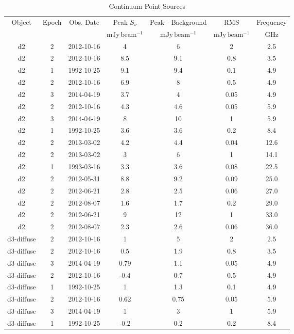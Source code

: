 \begin{table*}[htp]
\caption{Continuum Point Sources}
\begin{tabular}{ccccccc}
\label{tab:contsrcs_full}
Object & Epoch & Obs. Date & Peak $S_{\nu}$ & Peak - Background & RMS & Frequency \\
 &  &  & $\mathrm{mJy\,beam^{-1}}$ & $\mathrm{mJy\,beam^{-1}}$ & $\mathrm{mJy\,beam^{-1}}$ & $\mathrm{GHz}$ \\
\hline
d2 & 2 & 2012-10-16 & 4 & 6 & 2 & 2.5 \\
d2 & 2 & 2012-10-16 & 8.5 & 9.1 & 0.8 & 3.5 \\
d2 & 1 & 1992-10-25 & 9.1 & 9.4 & 0.1 & 4.9 \\
d2 & 2 & 2012-10-16 & 6.9 & 8 & 0.5 & 4.9 \\
d2 & 3 & 2014-04-19 & 3.7 & 4 & 0.05 & 4.9 \\
d2 & 2 & 2012-10-16 & 4.3 & 4.6 & 0.05 & 5.9 \\
d2 & 3 & 2014-04-19 & 8 & 10 & 1 & 5.9 \\
d2 & 1 & 1992-10-25 & 3.6 & 3.6 & 0.2 & 8.4 \\
d2 & 2 & 2013-03-02 & 4.2 & 4.4 & 0.04 & 12.6 \\
d2 & 2 & 2013-03-02 & 3 & 6 & 1 & 14.1 \\
d2 & 1 & 1993-03-16 & 3.3 & 3.6 & 0.08 & 22.5 \\
d2 & 2 & 2012-05-31 & 8.8 & 9.2 & 0.09 & 25.0 \\
d2 & 2 & 2012-06-21 & 2.8 & 2.5 & 0.06 & 27.0 \\
d2 & 2 & 2012-08-07 & 1.6 & 1.7 & 0.2 & 29.0 \\
d2 & 2 & 2012-06-21 & 9 & 12 & 1 & 33.0 \\
d2 & 2 & 2012-08-07 & 2.3 & 2.6 & 0.06 & 36.0 \\
d3-diffuse & 2 & 2012-10-16 & 1 & 5 & 2 & 2.5 \\
d3-diffuse & 2 & 2012-10-16 & 0.5 & 1.9 & 0.8 & 3.5 \\
d3-diffuse & 3 & 2014-04-19 & 0.79 & 1.1 & 0.05 & 4.9 \\
d3-diffuse & 2 & 2012-10-16 & -0.4 & 0.7 & 0.5 & 4.9 \\
d3-diffuse & 1 & 1992-10-25 & 1 & 1.3 & 0.1 & 4.9 \\
d3-diffuse & 2 & 2012-10-16 & 0.62 & 0.75 & 0.05 & 5.9 \\
d3-diffuse & 3 & 2014-04-19 & 1 & 3 & 1 & 5.9 \\
d3-diffuse & 1 & 1992-10-25 & -0.2 & 0.2 & 0.2 & 8.4 \\

\end{tabular}
\end{table*}
